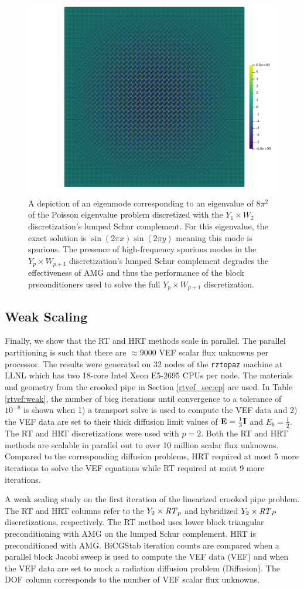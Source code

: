 \documentclass[../doc.tex]{subfiles}
\begin{document}
\begin{figure}
\centering
\includegraphics[width=.5\textwidth]{data/img/badmode40.png}
\caption{A depiction of an eigenmode corresponding to an eigenvalue of $8\pi^2$ of the Poisson eigenvalue problem discretized with the $Y_1\times W_2$ discretization's lumped Schur complement. For this eigenvalue, the exact solution is $\sin(2\pi x)\sin(2\pi y)$ meaning this mode is spurious. The presence of high-frequency spurious modes in the $Y_p\times W_{p+1}$ discretization's lumped Schur complement degrades the effectiveness of AMG and thus the performance of the block preconditioners used to solve the full $Y_p\times W_{p+1}$ discretization.}
\label{rtvef:badmode}
\end{figure}

\subsection{Weak Scaling} \label{rtvef_sec:weak}
Finally, we show that the RT and HRT methods scale in parallel. The parallel partitioning is such that there are $\approx\!\num{9000}$ VEF scalar flux unknowns per processor. The results were generated on 32 nodes of the \texttt{rztopaz} machine at LLNL which has two 18-core Intel Xeon E5-2695 CPUs per node. The materials and geometry from the crooked pipe in Section \ref{rtvef_sec:cp} are used. In Table \ref{rtvef:weak}, the number of \gls{bicg} iterations until convergence to a tolerance of $10^{-8}$ is shown when 1) a transport solve is used to compute the VEF data and 2) the VEF data are set to their thick diffusion limit values of $\boldsymbol{\mathrm{E}} = \frac{1}{3}\boldsymbol{\mathrm{I}}$ and $E_b = \frac{1}{2}$. The RT and HRT discretizations were used with $p=2$. Both the RT and HRT methods are scalable in parallel out to over 10 million scalar flux unknowns. Compared to the corresponding diffusion problems, HRT required at most 5 more iterations to solve the VEF equations while RT required at most 9 more iterations. 
\begin{table}
\centering
\caption{A weak scaling study on the first iteration of the linearized crooked pipe problem. The RT and HRT columns refer to the $Y_2\times \mathit{RT}_p$ and hybridized $Y_2\times \mathit{RT}_P$ discretizations, respectively. The RT method uses lower block triangular preconditioning with AMG on the lumped Schur complement. HRT is preconditioned with AMG. BiCGStab iteration counts are compared when a parallel block Jacobi sweep is used to compute the VEF data (VEF) and when the VEF data are set to mock a radiation diffusion problem (Diffusion). The DOF column corresponds to the number of VEF scalar flux unknowns.}
\label{rtvef:weak}

\end{table}
\end{document}
